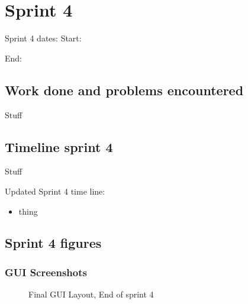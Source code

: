 \documentclass[11pt]{article} %
\begin{document}
{\newpage
\section{Sprint 4}
Sprint 4 dates:  Start: \date{4/20/2017}  End: \date{4/??/2017}

\subsection{Work done and problems encountered}
Stuff

\subsection{Timeline sprint 4}
%
Stuff

\noindent Updated Sprint 4 time line:
\begin{itemize}
	\item thing
\end{itemize}

\newpage
\subsection{Sprint 4 figures}
\subsubsection{GUI Screenshots}

  \begin{figure}[H]
  	\centering
  	\caption{Final GUI Layout, End of sprint 4}
  	\label{fig:GUI Design at End of Project}
  \end{figure}
  
}
\end{document}
